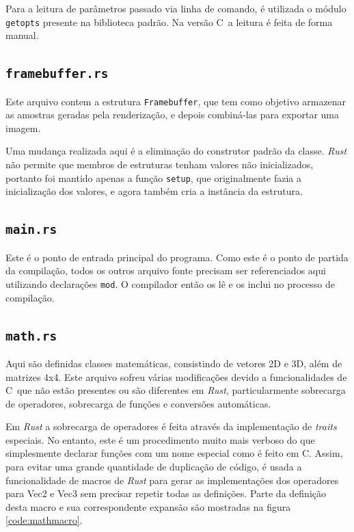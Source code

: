 \documentclass[tg]{mdtufsm}
\def\Cpp{{C\nolinebreak[4]\raisebox{.20ex}{\small\bf++}}}
\begin{document}
Para a leitura de parâmetros passado via linha de comando, é utilizada o módulo \texttt{getopts} presente na biblioteca padrão. Na versão \Cpp\ a leitura é feita de forma manual.

\subsection{\texttt{framebuffer.rs}}

Este arquivo contem a estrutura \texttt{Framebuffer}, que tem como objetivo armazenar as amostras geradas pela renderização, e depois combiná-las para exportar uma imagem.

Uma mudança realizada aqui é a eliminação do construtor padrão da classe. \emph{Rust} não permite que membros de estruturas tenham valores não inicializados, portanto foi mantido apenas a função \texttt{setup}, que originalmente fazia a inicialização dos valores, e agora também cria a instância da estrutura.

\subsection{\texttt{main.rs}}

Este é o ponto de entrada principal do programa. Como este é o ponto de partida da compilação, todos os outros arquivo fonte precisam ser referenciados aqui utilizando declarações \texttt{mod}. O compilador então os lê e os inclui no processo de compilação.

\subsection{\texttt{math.rs}}

Aqui são definidas classes matemáticas, consistindo de vetores 2D e 3D, além de matrizes 4x4. Este arquivo sofreu várias modificações devido a funcionalidades de \Cpp\ que não estão presentes ou são diferentes em \emph{Rust}, particularmente sobrecarga de operadores, sobrecarga de funções e conversões automáticas.

Em \emph{Rust} a sobrecarga de operadores é feita através da implementação de \emph{traits} especiais. No entanto, este é um procedimento muito mais verboso do que simplesmente declarar funções com um nome especial como é feito em \Cpp. Assim, para evitar uma grande quantidade de duplicação de código, é usada a funcionalidade de macros de \emph{Rust} para gerar as implementações dos operadores para Vec2 e Vec3 sem precisar repetir todas as definições. Parte da definição desta macro e sua correspondente expansão são mostradas na figura \ref{code:mathmacro}.
\end{document}
